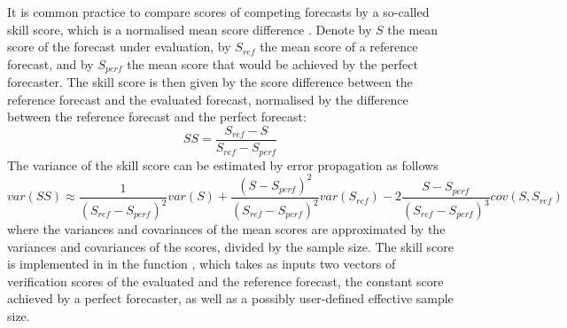 \documentclass[article]{jss}
\begin{document}
It is common practice to compare scores of competing forecasts by a so-called skill score, which is a normalised mean score difference \citep{wilks2011statistical}.
Denote by $S$ the mean score of the forecast under evaluation, by $S_{ref}$ the mean score of a reference forecast, and by $S_{perf}$ the mean score that would be achieved by the perfect forecaster.
The skill score is then given by the score difference between the reference forecast and the evaluated forecast, normalised by the difference between the reference forecast and the perfect forecast:
%
\begin{equation}
SS = \frac{S_{ref} - S}{S_{ref} - S_{perf}}
\end{equation}
%
The variance of the skill score can be estimated by error propagation as follows
%
\begin{equation}
var(SS) \approx \frac{1}{(S_{ref} - S_{perf})^2} var(S) + \frac{(S - S_{perf})^2}{(S_{ref}-S_{perf})^2} var(S_{ref}) - 2 \frac{S-S_{perf}}{(S_{ref}-S_{perf})^3} cov(S, S_{ref})
\end{equation}
%
where the variances and covariances of the mean scores are approximated by the variances and covariances of the scores, divided by the sample size.
The skill score is implemented in  in the function , which takes as inputs two vectors of verification scores of the evaluated and the reference forecast, the constant score achieved by a perfect forecaster, as well as a possibly user-defined effective sample size.
\end{document}
